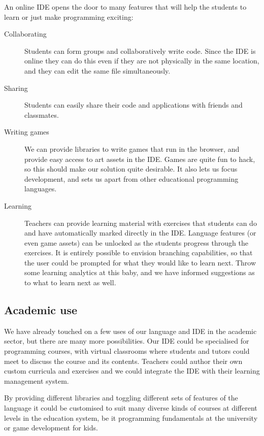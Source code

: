 An online IDE opens the door to many features that will help the students to
learn or just make programming exciting:
\begin{description}
  \item[Collaborating]
    Students can form groups and collaboratively write code.  Since the IDE is
    online they can do this even if they are not physically in the same
    location, and they can edit the same file simultaneously.
  \item[Sharing]
    Students can easily share their code and applications with friends and
    classmates.
  \item[Writing games] 
    We can provide libraries to write games that run in the browser, and
    provide easy access to art assets in the IDE. Games are quite fun to hack, 
    so this should make our solution quite desirable. It also lets us focus 
    development, and sets us apart from other educational programming 
    languages.
  \item[Learning]
    Teachers can provide learning material with exercises that students can do
    and have automatically marked directly in the IDE. Language features (or
    even game assets) can be unlocked as the students progress through the
    exercises. It is entirely possible to envision branching capabilities, so 
    that the user could be prompted for what they would like to learn next. 
    Throw some learning analytics at this baby, and we have informed 
    suggestions as to what to learn next as well.
\end{description}

\subsection{Academic use}

We have already touched on a few uses of our language and IDE in the academic
sector, but there are many more possibilities.
Our IDE could be specialised for programming courses, with virtual classrooms
where students and tutors could meet to discuss the course and its contents.
Teachers could author their own custom curricula and exercises and we could
integrate the IDE with their learning management system.

By providing different libraries and toggling different sets of features of the
language it could be customised to suit many diverse kinds of courses at
different levels in the education system, be it programming fundamentals at the
university or game development for kids.

